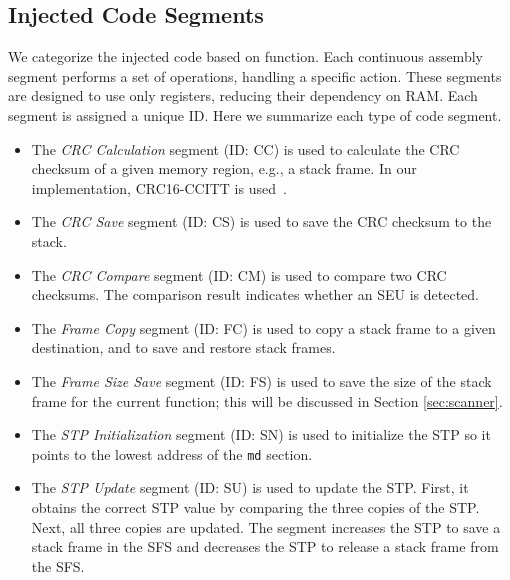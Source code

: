 \subsection{Injected Code Segments}
\vspace{-5pt}
We categorize the injected code based on function. Each continuous assembly segment performs a set of operations, handling a specific action. These segments are designed to use only registers, reducing their dependency on RAM. Each segment is assigned a unique ID. Here we summarize each type of code segment.
\vspace{-10pt}
\begin{itemize} \itemsep 0in

\item The \textit{CRC Calculation} segment (ID: CC) is used to calculate the CRC checksum of a given memory region, e.g., a stack frame. In our implementation, CRC16-CCITT is used~\cite{crc16}.

\item The \textit{CRC Save} segment (ID: CS) is used to save the CRC checksum to the stack.

\item The \textit{CRC Compare} segment (ID: CM) is used to compare two CRC checksums. The comparison result indicates whether an SEU is detected.

\item The \textit{Frame Copy} segment (ID: FC) is used to copy a stack frame to a given destination, and to save and restore stack frames.

\item The \textit{Frame Size Save} segment (ID: FS) is used to save the size of the stack frame for the current function; this will be discussed in Section \ref{sec:scanner}.

\item The \textit{STP Initialization} segment (ID: SN) is used to initialize the STP so it points to the lowest address of the \texttt{md} section.

\item The \textit{STP Update} segment (ID: SU) is used to update the STP. First, it obtains the correct STP value by comparing the three copies of the STP. Next, all three copies are updated. The segment increases the STP to save a stack frame in the SFS and decreases the STP to release a stack frame from the SFS.

\end{itemize}
\vspace{-20pt}
